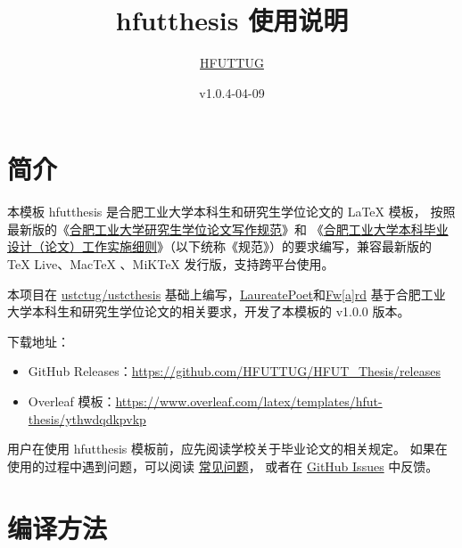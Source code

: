 \documentclass[a4paper]{ltxdoc}
\DeclareRobustCommand\pkg{\textsf}
\DeclareRobustCommand\cls{\textsf}
\begin{document}
\title{\cls{hfutthesis} 使用说明}
\author{
  \href{https://github.com/HFUTTUG}{HFUTTUG}
 }
\date{v1.0.4-04-09}
\maketitle



\section{简介}

本模板 \cls{hfutthesis} 是合肥工业大学本科生和研究生学位论文的 \LaTeX{}
模板， 按照最新版的《\href{http://xwgl.hfut.edu.cn/2021/0419/c1975a253949/page.htm}
{合肥工业大学研究生学位论文写作规范}》和
《\href{http://xcjwb.hfut.edu.cn/53/cc/c1144a21452/page.htm}
{合肥工业大学本科毕业设计（论文）工作实施细则}》（以下统称《规范》）的要求编写，兼容最新版的 TeX Live、MacTeX 、MiKTeX 发行版，支持跨平台使用。

本项目在 \href{https://github.com/ustctug/ustcthesis}
{ustctug/ustcthesis} 基础上编写，\href{https://github.com/LaureatePoet}{LaureatePoet}和\href{https://github.com/HowardZorn}{Fw[a]rd} 基于合肥工业大学本科生和研究生学位论文的相关要求，开发了本模板的 v1.0.0 版本。

下载地址：
\begin{itemize}
  \item GitHub Releases：\url{https://github.com/HFUTTUG/HFUT_Thesis/releases}
  \item Overleaf 模板：\url{https://www.overleaf.com/latex/templates/hfut-thesis/ythwdqdkpvkp}
\end{itemize}

用户在使用 \pkg{hfutthesis} 模板前，应先阅读学校关于毕业论文的相关规定。
如果在使用的过程中遇到问题，可以阅读
\href{https://github.com/HFUTTUG/HFUT_Thesis/wiki}{常见问题}，
或者在 \href{https://github.com/HFUTTUG/HFUT_Thesis/issues}{GitHub Issues}
中反馈。

\section{编译方法}
\end{document}
